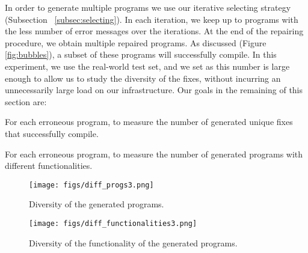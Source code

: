 \documentclass[runningheads]{llncs}
\newcommand{\samplefix}{SampleFix}
\newcommand{\dssmaplefix}{DS-SampleFix}
\newcommand{\figref}{Figure}
\begin{document}
In order to generate multiple programs we use our iterative selecting strategy (Subsection ~\ref{subsec:selecting}).
In each iteration, we keep up to  programs with the less number of error messages over the iterations. At the end of the repairing procedure, we obtain multiple repaired programs. As discussed (\figref \,\ref{fig:bubbles}), a subset of these programs will successfully compile. In this experiment, we use the real-world test set, and we set  as this number is large enough to allow us to study the diversity of the fixes, without incurring an unnecessarily large load on our infrastructure. Our goals in the remaining of this section are: \begin{enumerate*}
    \item For each erroneous program, to measure the number of  generated unique fixes that successfully compile.
    \item For each erroneous program, to measure the number of generated programs with different functionalities.
\end{enumerate*}  


\begin{figure*}
	\centering
	    \centering
	    
	    \begin{subfigure}[b]{0.49\textwidth}
	    \centering
		\texttt{[image: figs/diff\_progs3.png]}
		\caption{Diversity of the generated programs.}
		\label{fig:diff-prog}
		\vspace{.4cm}
    	\end{subfigure} \hfill
    	\begin{subfigure}[b]{0.49\textwidth}
    	    \centering
    		\texttt{[image: figs/diff\_functionalities3.png]} 
    		\caption{Diversity of the functionality of the generated programs.}
    		\label{fig:diff-func}
    	\end{subfigure} 
	
	\caption{The results show the performance of Beam search (BS), \samplefix\,, \dssmaplefix\,, and \dssmaplefix\,+ BS. (a) Percentage of the number of the generated successfully compiled, unique programs for the given erroneous programs. (b) Percentage of the successfully compiled programs with different functionalities for the given erroneous programs. }
	\label{fig:func}
	\vspace{-.5cm}
\end{figure*}
\end{document}
